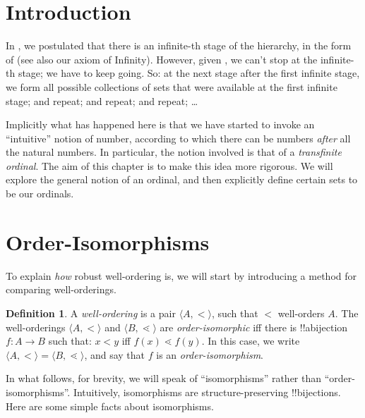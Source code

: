 \documentclass[10pt,a4paper]{article}
\makeatletter
\theoremstyle{plain}
\theoremstyle{definition}
\newtheorem{defn}[thm]{Definition}
\theoremstyle{remark}
\newcommand*{\olfileid}[3]{}
\newcommand*{\olsection}[1]{\section*{#1}}
\newcommand{\olref}{\@ifnextchar[{\olref@i}{\olref@final}}
\def\olref@i[#1]{\@ifnextchar[{\olref@ii}{\olref@final}}
\def\olref@ii[#1]{\@ifnextchar[{\olref@iii}{\olref@final}}
\def\olref@iii[#1]{\olref@final}
\def\olref@final#1{\ref{#1}}
\providecommand{\tuple}[1]{\langle #1 \rangle}
\providecommand{\ordeq}[2]{#1 = #2}
\makeatother
\begin{document}



\olfileid{sth}{ordinals}{intro}

\olsection{Introduction}

In \olref[z][]{chap}, we postulated that there is an infinite-th stage
of the hierarchy, in the form of \stagesinf{} (see also our axiom of
Infinity). However, given \stagessucc{}, we can't stop at the
infinite-th stage; we have to keep going. So: at the next stage after
the first infinite stage, we form all possible collections of sets
that were available at the first infinite stage; and repeat; and
repeat; and repeat; \dots

Implicitly what has happened here is that we have started to invoke an
``intuitive'' notion of number, according to which there can be
numbers \emph{after} all the natural numbers. In particular, the
notion involved is that of a \emph{transfinite ordinal}. The aim of
this chapter is to make this idea more rigorous. We will explore the
general notion of an ordinal, and then explicitly define certain sets
to be our ordinals. 



\olfileid{sth}{ordinals}{iso}
\olsection{Order-Isomorphisms}

To explain \emph{how} robust well-ordering is, we will start by
introducing a method for comparing well-orderings.

\begin{defn}
A \emph{well-ordering} is a pair $\tuple{A, <}$, such that $<$
well-orders $A$. The well-orderings $\tuple{A, <}$ and $\tuple{B,
\lessdot}$ are \emph{order-isomorphic} {iff} there is !!a{bijection}
$f \colon A \to B$ such that: $x < y$ iff $f(x) \lessdot  f(y)$. In
this case, we write $\ordeq{\tuple{A, <}}{\tuple{B, \lessdot}}$, and
say that $f$ is an \emph{order-isomorphism}.
\end{defn}
\noindent
In what follows, for brevity, we will speak of ``isomorphisms'' rather
than ``order-isomorphisms''. Intuitively, isomorphisms are
structure-preserving !!{bijection}s. Here are some simple facts about
isomorphisms.
\end{document}
